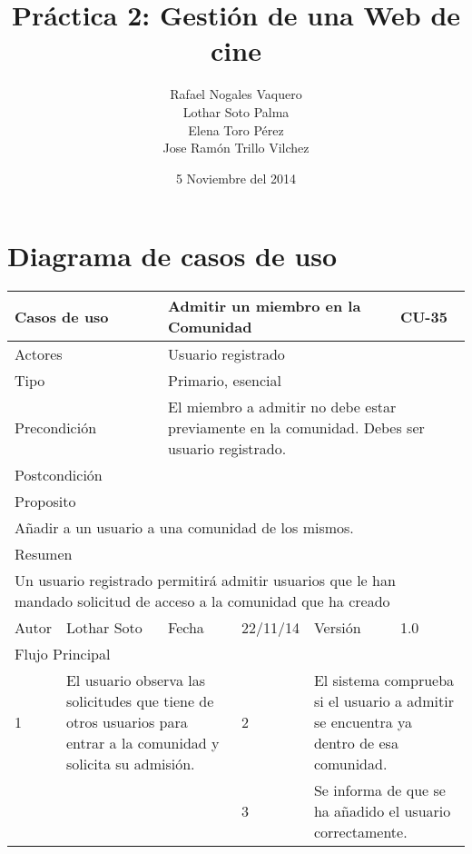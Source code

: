 \documentclass{article}
\title{Práctica 2: Gestión de una Web de cine}
\author{Rafael Nogales Vaquero
\\Lothar Soto Palma
\\Elena Toro Pérez
\\Jose Ramón Trillo Vilchez}
\date{5 Noviembre del 2014}
\begin{document}
\maketitle
\section{Diagrama de casos de uso}
\begin{table}[h]
\begin{tabular}{|l|l|l|l|l|l|}
\hline
\multicolumn{2}{|p{2cm}|}{Casos de uso}  & \multicolumn{3}{p{7cm}|}{Admitir un miembro en la Comunidad} & CU-35 \\
\hline
\multicolumn{2}{|p{2cm}|}{Actores}       & \multicolumn{4}{p{8cm}|}{Usuario registrado}        \\
\hline
\multicolumn{2}{|p{2cm}|}{Tipo}          & \multicolumn{4}{p{8cm}|}{Primario, esencial}        \\
\hline
\multicolumn{2}{|p{2cm}|}{Precondición}  & \multicolumn{4}{p{8cm}|}{El miembro a admitir no debe estar previamente en la comunidad. Debes ser usuario registrado.}        \\
\hline
\multicolumn{2}{|p{2cm}|}{Postcondición} & \multicolumn{4}{p{8cm}|}{}        \\
\hline
\multicolumn{6}{|p{10cm}|}{Proposito}                                   \\
\hline
\multicolumn{6}{|p{10cm}|}{Añadir a un usuario a una comunidad de los mismos.}                                            \\
\hline
\multicolumn{6}{|p{10cm}|}{Resumen}                                 \\
\hline
\multicolumn{6}{|p{10cm}|}{Un usuario registrado permitirá admitir usuarios que le han mandado solicitud de acceso a la comunidad que ha creado}                                            \\
\hline
Autor         &       Lothar Soto        &  Fecha   &  22/11/14   &   Versión  & 1.0\\     
\hline
\multicolumn{6}{|p{10cm}|}{Flujo Principal}\\
\hline
\multicolumn{1}{|p{0.5cm}|}{1} & \multicolumn{2}{p{3cm}}{El usuario observa las solicitudes que tiene de otros usuarios para entrar a la comunidad y solicita su admisión.} & \multicolumn{1}{|p{0.5cm}|}{2} & \multicolumn{2}{p{3cm}|}{El sistema comprueba si el usuario a admitir se encuentra ya dentro de esa comunidad.}\\
\hline
\multicolumn{1}{|p{0.5cm}|}{} & \multicolumn{2}{p{3cm}}{} & \multicolumn{1}{|p{0.5cm}|}{3} & \multicolumn{2}{p{3cm}|}{Se informa de que se ha añadido el usuario correctamente.}\\
\hline


\end{tabular}
\end{table}
\end{document}
